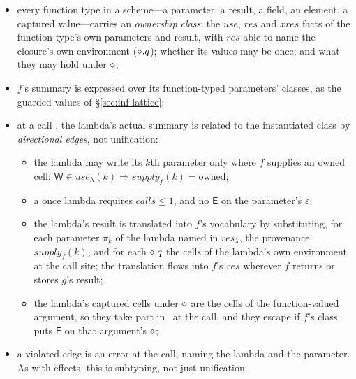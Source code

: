 \begin{itemize}
\item every function type in a scheme---a parameter, a result, a field, an element, a captured
value---carries an \emph{ownership class}: the $\mathit{use}$, $\mathit{res}$ and $\mathit{xres}$ facts
of the function type's own parameters and result, with $\mathit{res}$ able to name the closure's own
environment ($\diamond.q$); whether its values may be once; and what they may hold under $\diamond$;
\item $f$'s summary is expressed over its function-typed parameters' classes, as the guarded values of
\S\ref{sec:inf-lattice};
\item at a call , the lambda's actual summary is related to the instantiated class by
\emph{directional edges}, not unification:
\begin{itemize}
\item the lambda may write its $k$th parameter only where $f$ supplies an owned cell:
$\mathsf{W} \in \mathit{use}_\lambda(k) \Rightarrow \mathit{supply}_f(k) = \mathrm{owned}$;
\item a once lambda requires $\mathit{calls} \le 1$, and no $\mathsf{E}$ on the parameter's
$\varepsilon$;
\item the lambda's result is translated into $f$'s vocabulary by substituting, for each parameter
$\pi_k$ of the lambda named in $\mathit{res}_\lambda$, the provenance $\mathit{supply}_f(k)$, and for each
$\diamond.q$ the cells of the lambda's own environment at the call site; the translation flows into $f$'s
$\mathit{res}$ wherever $f$ returns or stores $g$'s result;
\item the lambda's captured cells under $\diamond$ are the cells of the function-valued argument, so they
take part in \Disjoint\ at the call, and they escape if $f$'s class puts $\mathsf{E}$ on that
argument's $\diamond$;
\end{itemize}
\item a violated edge is an error at the call, naming the lambda and the parameter. As with effects,
this is subtyping, not just unification.
\end{itemize}

